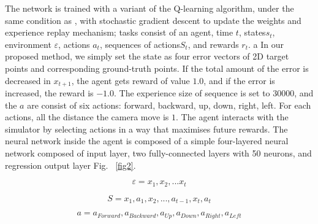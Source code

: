 \documentclass[10pt]{article}
\begin{document}
The network is trained with a variant of the Q-learning\cite{ref1} algorithm, under the same condition as \cite{ref2}, with stochastic gradient descent to update the weights and experience replay mechanism; tasks consist of an agent, time $t$, states$s_t$, environment $\varepsilon$, actions $a_t$,  sequences of actions$S_t$, and rewards $r_t$. a  In our proposed method, we simply set the state as four error vectors of 2D target points and corresponding ground-truth points. If the total amount of the error is decreased in $x_{t+1}$, the agent gets reward of value $1.0$, and if the error is increased, the reward is $-1.0$. The experience size of sequence is set to $30000$, and the $a$ are consist of six actions: forward, backward, up, down, right, left. For each actions, all the distance the camera move is $1$. The agent interacts with the simulator by selecting actions in a way that maximises future rewards. The neural network inside the agent is composed of a simple four-layered neural network composed of input layer, two fully-connected layers with 50 neurons, and regression output layer Fig. ~\ref{fig2}.

\begin{equation}\label{environment}
  \varepsilon = {x_1, x_2, ... x_t}
\end{equation}

\begin{equation}\label{sequences}
  S = {x_1, a_1, x_2, ..., a_{t-1}, x_t, a_t}
\end{equation}

\begin{equation}\label{actions}
  a = {a_{Forward}, a_{Backward}, a_{Up}, a_{Down}, a_{Right}, a_{Left}}
\end{equation}
\end{document}
